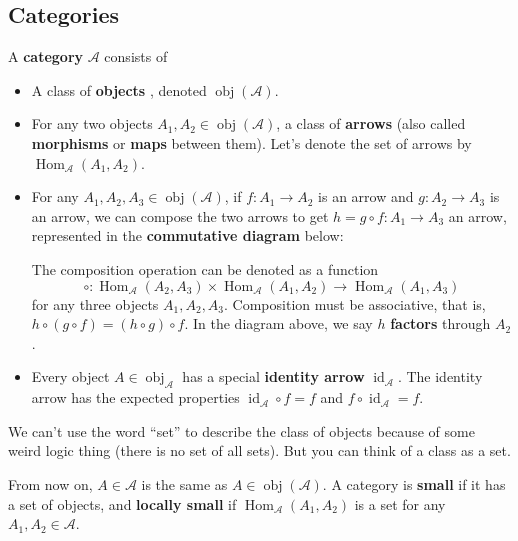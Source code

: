 \subsection{Categories}
\begin{definition}[Category]
    A \textbf{category} $\mathcal{A}$ consists of 
    \begin{itemize}
        \item A class of \textbf{objects} , denoted $\operatorname{obj}(\mathcal{A}).$ 
        \item For any two objects $A_1,A_2\in \operatorname{obj}(\mathcal{A})$, a class of \textbf{arrows} (also called  \textbf{morphisms} or \textbf{maps} between them). Let's denote the set of arrows by $\operatorname{Hom}_{\mathcal{A}}(A_1,A_2)$.
        \item For any $A_1,A_2,A_3\in \operatorname{obj}(\mathcal{A})$, if $f \colon A_1 \to A_2$ is an arrow and $g \colon A_2 \to A_3$ is an arrow, we can compose the two arrows to get $h=g\circ f \colon A_1 \to A_3$ an arrow, represented in the \textbf{commutative diagram} below: 
            \begin{figure}[H]
                \centering
            \end{figure}
        The composition operation can be denoted as a function \[
            \circ \colon \operatorname{Hom}_{\mathcal{A}}(A_2,A_3)\times \operatorname{Hom}_{\mathcal{A}}(A_1,A_2) \to \operatorname{Hom}_{\mathcal{A}}(A_1,A_3)
        \] for any three objects $A_1,A_2,A_3$. Composition must be associative, that is, $h\circ(g\circ f)=(h\circ g)\circ f.$ In the diagram above, we say $h$ \textbf{factors} through $A_2$.
    \item Every object $A\in \operatorname{obj}_{\mathcal{A}}$ has a special \textbf{identity arrow} $ \operatorname{id}_{\mathcal{A}}$. The identity arrow has the expected properties $\operatorname{id}_{\mathcal{A}}\circ f=f$ and $f\circ \operatorname{id}_{\mathcal{A}}=f$.
    \end{itemize}
\end{definition}
\begin{note}
    We can't use the word ``set'' to describe the class of objects because of some weird logic thing (there is no set of all sets). But you can think of a class as a set.
\end{note}
From now on, $A\in \mathcal{A}$ is the same as $A\in \operatorname{obj}(\mathcal{A})$. A category is \textbf{small} if it has a set of objects, and \textbf{locally small} if $\operatorname{Hom}_{\mathcal{A}}(A_1,A_2)$ is a set for any $A_1,A_2\in \mathcal{A}$.

